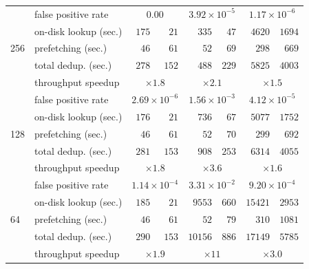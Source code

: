 \documentclass[prodmode,acmtecs]{acmsmall}
\begin{document}
\begin{table}[htp]
\begin{tabular}{llrrrrrr}
\cmidrule(lr){1-1} \cmidrule(lr){2-2} \cmidrule(lr){3-4} \cmidrule(lr){5-6} \cmidrule(lr){7-8}
\multirow{5}{*}{256} & false positive rate & \multicolumn{2}{c}{$0.00$} & \multicolumn{2}{c}{$3.92\times 10^{-5}$} & \multicolumn{2}{c}{$1.17\times 10^{-6}$} \\
& on-disk lookup (sec.)& $175$ & $21$ & $335$ & $47$ & $4620$ & $1694$ \\
& prefetching (sec.) & $46$ & $61$ & $52$ & $69$ & $298$ & $669$ \\
& total dedup. (sec.) & $278$ & $152$ & $488$ & $229$ & $5825$ & $4003$ \\
& throughput speedup & \multicolumn{2}{c}{$\times 1.8$} & \multicolumn{2}{c}{$\times 2.1$} & \multicolumn{2}{c}{$\times 1.5$} \\

\cmidrule(lr){1-1} \cmidrule(lr){2-2} \cmidrule(lr){3-4} \cmidrule(lr){5-6} \cmidrule(lr){7-8}
\multirow{5}{*}{128} & false positive rate & \multicolumn{2}{c}{$2.69\times 10^{-6}$} & \multicolumn{2}{c}{$1.56\times 10^{-3}$} & \multicolumn{2}{c}{$4.12\times 10^{-5}$} \\
& on-disk lookup (sec.)& $176$ & $21$ & $736$ & $67$ & $5077$ & $1752$ \\
& prefetching (sec.) & $46$ & $61$ & $52$ & $70$ & $299$ & $692$  \\
& total dedup. (sec.) & $281$ & $153$ & $908$ & $253$ & $6314$ & $4055$\\
& throughput speedup & \multicolumn{2}{c}{$\times 1.8$} & \multicolumn{2}{c}{$\times 3.6$} & \multicolumn{2}{c}{$\times 1.6$} \\

\cmidrule(lr){1-1} \cmidrule(lr){2-2} \cmidrule(lr){3-4} \cmidrule(lr){5-6} \cmidrule(lr){7-8}
\multirow{5}{*}{64} & false positive rate & \multicolumn{2}{c}{$1.14\times 10^{-4}$} & \multicolumn{2}{c}{$3.31\times 10^{-2}$} & \multicolumn{2}{c}{$9.20\times 10^{-4}$} \\
& on-disk lookup (sec.)& $185$ & $21$ & $9553$ & $660$ & $15421$ & $2953$ \\
& prefetching (sec.) & $46$ & $61$ & $52$ & $79$ & $310$ & $1081$  \\
& total dedup. (sec.) & $290$ & $153$ & $10156$ & $886$ & $17149$ & $5785$ \\
& throughput speedup & \multicolumn{2}{c}{$\times 1.9$} & \multicolumn{2}{c}{$\times 11$} & \multicolumn{2}{c}{$\times 3.0$} \\


\end{tabular}
\end{table}
\end{document}
